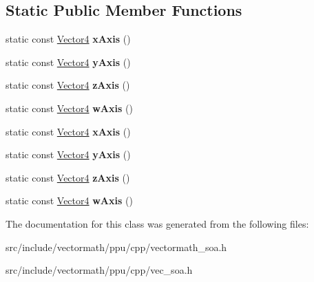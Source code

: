\subsection*{Static Public Member Functions}
\begin{DoxyCompactItemize}
\item 
\hypertarget{classVectormath_1_1Soa_1_1Vector4_afcb5f3e3ca84dad16ad5825b2c2d3477}{static const \hyperlink{classVectormath_1_1Soa_1_1Vector4}{Vector4} {\bfseries x\-Axis} ()}\label{classVectormath_1_1Soa_1_1Vector4_afcb5f3e3ca84dad16ad5825b2c2d3477}

\item 
\hypertarget{classVectormath_1_1Soa_1_1Vector4_ad6c6351367a4264d62612c21ad4ce4f6}{static const \hyperlink{classVectormath_1_1Soa_1_1Vector4}{Vector4} {\bfseries y\-Axis} ()}\label{classVectormath_1_1Soa_1_1Vector4_ad6c6351367a4264d62612c21ad4ce4f6}

\item 
\hypertarget{classVectormath_1_1Soa_1_1Vector4_af4fd932c3e43c3eae28c3e14b43b7d6c}{static const \hyperlink{classVectormath_1_1Soa_1_1Vector4}{Vector4} {\bfseries z\-Axis} ()}\label{classVectormath_1_1Soa_1_1Vector4_af4fd932c3e43c3eae28c3e14b43b7d6c}

\item 
\hypertarget{classVectormath_1_1Soa_1_1Vector4_aab5c50b00703f73dc5f3c320d726c611}{static const \hyperlink{classVectormath_1_1Soa_1_1Vector4}{Vector4} {\bfseries w\-Axis} ()}\label{classVectormath_1_1Soa_1_1Vector4_aab5c50b00703f73dc5f3c320d726c611}

\item 
\hypertarget{classVectormath_1_1Soa_1_1Vector4_ac85ecc91de6b2206b64fd9c3df3702f5}{static const \hyperlink{classVectormath_1_1Soa_1_1Vector4}{Vector4} {\bfseries x\-Axis} ()}\label{classVectormath_1_1Soa_1_1Vector4_ac85ecc91de6b2206b64fd9c3df3702f5}

\item 
\hypertarget{classVectormath_1_1Soa_1_1Vector4_a97e7ec43b008e31d39068c0c6fd54de3}{static const \hyperlink{classVectormath_1_1Soa_1_1Vector4}{Vector4} {\bfseries y\-Axis} ()}\label{classVectormath_1_1Soa_1_1Vector4_a97e7ec43b008e31d39068c0c6fd54de3}

\item 
\hypertarget{classVectormath_1_1Soa_1_1Vector4_a0026691bc6b44a364318d444d05734d9}{static const \hyperlink{classVectormath_1_1Soa_1_1Vector4}{Vector4} {\bfseries z\-Axis} ()}\label{classVectormath_1_1Soa_1_1Vector4_a0026691bc6b44a364318d444d05734d9}

\item 
\hypertarget{classVectormath_1_1Soa_1_1Vector4_a7ee75a6e33c8d5c2f29992bf19091551}{static const \hyperlink{classVectormath_1_1Soa_1_1Vector4}{Vector4} {\bfseries w\-Axis} ()}\label{classVectormath_1_1Soa_1_1Vector4_a7ee75a6e33c8d5c2f29992bf19091551}

\end{DoxyCompactItemize}


The documentation for this class was generated from the following files\-:\begin{DoxyCompactItemize}
\item 
src/include/vectormath/ppu/cpp/vectormath\-\_\-soa.\-h\item 
src/include/vectormath/ppu/cpp/vec\-\_\-soa.\-h\end{DoxyCompactItemize}
